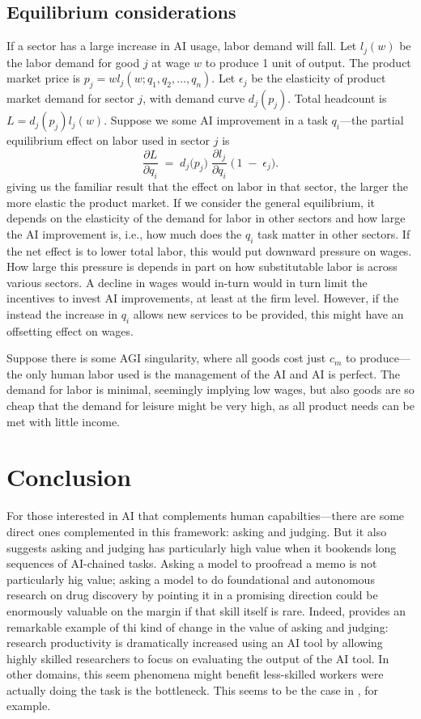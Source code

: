 \documentclass{article}
\begin{document}
\subsection{Equilibrium considerations}
If a sector has a large increase in AI usage, labor demand will fall. 
Let $l_j(w)$ be the labor demand for good $j$ at wage $w$ to produce 1 unit of output.
The product market price is $p_j = w l_j(w; q_1, q_2, \dots, q_n)$.
Let $\epsilon_j$ be the elasticity of product market demand for sector $j$, with demand curve $d_j(p_j)$.
Total headcount is $L = d_j(p_j) l_j(w)$.
Suppose we some AI improvement in a task $q_i$---the partial equilibrium effect on labor used in sector $j$ is
\begin{equation}
\frac{\partial L}{\partial q_i} 
\;=\; 
d_j\bigl(p_j\bigr)\;\frac{\partial l_j}{\partial q_i}\;
\bigl(\,1 \;-\;\epsilon_j\bigr).
\end{equation}
giving us the familiar result that the effect on labor in that sector, the larger the more elastic the product market.
If we consider the general equilibrium, it depends on the elasticity of the demand for labor in other sectors and how large the AI improvement is, i.e., how much does the $q_i$ task matter in other sectors.
If the net effect is to lower total labor, this would put downward pressure on wages. 
How large this pressure is depends in part on how substitutable labor is across various sectors.
A decline in wages would in-turn would in turn limit the incentives to invest AI improvements, at least at the firm level.
However, if the instead the increase in $q_i$ allows new services to be provided, this might have an offsetting effect on wages. 

Suppose there is some AGI singularity, where all goods cost just $c_m$ to produce---the only human labor used is the management of the AI and AI is perfect.
The demand for labor is minimal, seemingly implying low wages, but also goods are so cheap that the demand for leisure might be very high, as all product needs can be met with little income.

\section{Conclusion}

For those interested in AI that complements human capabilties---there are some direct ones complemented in this framework: asking and judging. 
But it also suggests asking and judging has particularly high value when it bookends long sequences of AI-chained tasks.  
Asking a model to proofread a memo is not particularly hig value; 
asking a model to do foundational and autonomous research on drug discovery by pointing it in a promising direction could be enormously valuable on the margin if that skill itself is rare. 
Indeed, \cite{toner2024artificial} provides an remarkable example of thi kind of change in the value of asking and judging: 
research productivity is dramatically increased using an AI tool by allowing highly skilled researchers to focus on evaluating the output of the AI tool. 
In other domains, this seem phenomena might benefit less-skilled workers were actually doing the task is the bottleneck.
This seems to be the case in \cite{brynjolfsson2023generative}, for example. 
\end{document}

